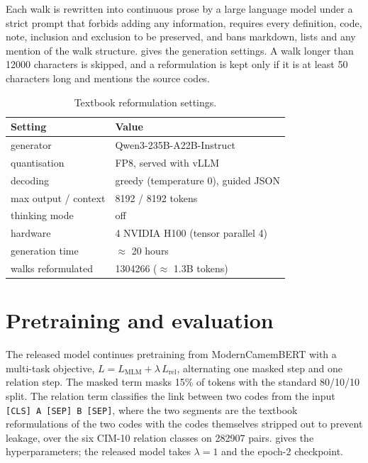 Each walk is rewritten into continuous prose by a large language model under a strict
prompt that forbids adding any information, requires every definition, code, note,
inclusion and exclusion to be preserved, and bans markdown, lists and any mention of
the walk structure.  gives the generation settings. A walk longer
than 12000 characters is skipped, and a reformulation is kept only if it is at least
50 characters long and mentions the source codes.

\begin{table}[t]
  \centering
  \small
  \setlength{\tabcolsep}{12pt}
  \begin{tabular}{@{}ll@{}}
    \toprule
    Setting & Value \\
    \midrule
    generator        & Qwen3-235B-A22B-Instruct~\citep{yang2025qwen3} \\
    quantisation     & FP8, served with vLLM~\citep{kwon2023vllm} \\
    decoding         & greedy (temperature 0), guided JSON \\
    max output / context & 8192 / 8192 tokens \\
    thinking mode    & off \\
    hardware         & 4 NVIDIA H100 (tensor parallel 4) \\
    generation time  & $\approx$ 20 hours \\
    walks reformulated & 1304266 ($\approx$ 1.3B tokens) \\
    \bottomrule
  \end{tabular}
\caption{Textbook reformulation settings.}
\label{tab:ob-gen}
\end{table}

\section{Pretraining and evaluation}

The released model continues pretraining from ModernCamemBERT with a multi-task
objective, $L = L_{\text{MLM}} + \lambda\, L_{\text{rel}}$, alternating one masked
step and one relation step. The masked term masks 15\% of tokens with the standard
80/10/10 split. The relation term classifies the link between two codes from the
input \texttt{[CLS] A [SEP] B [SEP]}, where the two segments are the textbook
reformulations of the two codes with the codes themselves stripped out to prevent
leakage, over the six CIM-10 relation classes on 282907 pairs. 
gives the hyperparameters; the released model takes $\lambda = 1$ and the epoch-2
checkpoint.

